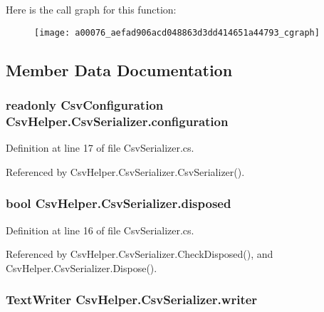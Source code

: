 Here is the call graph for this function\-:
\nopagebreak
\begin{figure}[H]
\begin{center}
\leavevmode
\texttt{[image: a00076\_aefad906acd048863d3dd414651a44793\_cgraph]}
\end{center}
\end{figure}




\subsection{Member Data Documentation}
\hypertarget{a00076_ae8c56ff97c0a797245f2205c486833ea}{
\subsubsection[{configuration}]{\setlength{\rightskip}{0pt plus 5cm}readonly {\bf Csv\-Configuration} Csv\-Helper.\-Csv\-Serializer.\-configuration\hspace{0.3cm}{\ttfamily [private]}}}\label{a00076_ae8c56ff97c0a797245f2205c486833ea}


Definition at line 17 of file Csv\-Serializer.\-cs.



Referenced by Csv\-Helper.\-Csv\-Serializer.\-Csv\-Serializer().

\hypertarget{a00076_a2687885dae7f7b0eec3c2db81c05f7e4}{
\subsubsection[{disposed}]{\setlength{\rightskip}{0pt plus 5cm}bool Csv\-Helper.\-Csv\-Serializer.\-disposed\hspace{0.3cm}{\ttfamily [private]}}}\label{a00076_a2687885dae7f7b0eec3c2db81c05f7e4}


Definition at line 16 of file Csv\-Serializer.\-cs.



Referenced by Csv\-Helper.\-Csv\-Serializer.\-Check\-Disposed(), and Csv\-Helper.\-Csv\-Serializer.\-Dispose().

\hypertarget{a00076_adfb235fa2c868fc79c0376fd12fda767}{
\subsubsection[{writer}]{\setlength{\rightskip}{0pt plus 5cm}Text\-Writer Csv\-Helper.\-Csv\-Serializer.\-writer\hspace{0.3cm}{\ttfamily [private]}}}\label{a00076_adfb235fa2c868fc79c0376fd12fda767}



